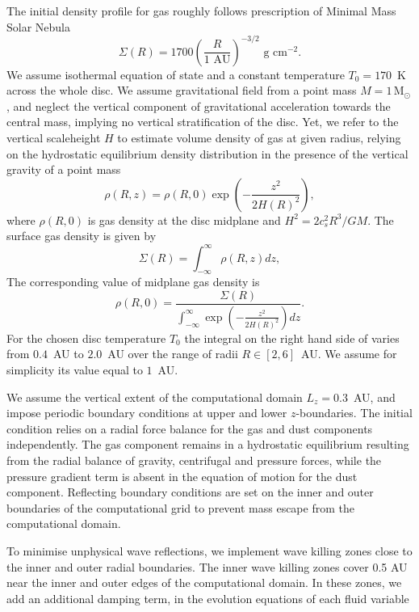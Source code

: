 The initial density profile for gas roughly follows prescription of Minimal Mass
Solar Nebula~\citep{H81}
\begin{equation}
   \Sigma(R) = 1700 \left(\frac{R}{1\textrm{ AU}}\right)^{-3/2} 
   \textrm{ g cm}^{-2}.
\end{equation}
We assume isothermal equation of state and a constant temperature $T_0 = 170$~K
across the whole disc. 
We assume gravitational field from a point mass $M=1\,\textrm{M}_\odot$, and
neglect the vertical component of gravitational acceleration towards the central
mass, implying no vertical stratification of the disc. Yet, we refer to the
vertical scaleheight $H$ to estimate  volume density of gas at given radius,
relying on the hydrostatic equilibrium density distribution in the presence of
the vertical gravity of a point mass
%
\begin{equation}
   \rho(R,z) =  \rho(R,0) \exp\left(-\frac{z^2}{2H(R)^2}\right),
\end{equation}
where $\rho(R,0)$ is gas density at the disc midplane and $H^2 = 2 c_s^2 R^3/
GM$.
%
The surface gas density is given by
\begin{equation}
   \Sigma(R) = \int_{-\infty}^\infty \rho(R,z) dz,
\end{equation}
%
The corresponding value of midplane gas density is
\begin{equation}
   \label{eq:rho}
    \rho(R,0) = \frac{\Sigma(R) }{\int_{-\infty}^\infty
   \exp\left(-\frac{z^2}{2H(R)^2}\right) dz}.
\end{equation}
For the chosen disc temperature $T_0$ the integral on the right hand side of
 varies from $0.4$~AU to $2.0$~AU over the range of radii $R\in
[2,6]$~AU. 
We assume for simplicity its value equal to $1$~AU. 

We assume the vertical extent of the computational domain $L_z = 0.3$~AU, and
impose periodic boundary conditions at upper and lower $z$-boundaries. The
initial condition relies on a radial force balance for the gas and dust
components independently. The gas component remains in a hydrostatic equilibrium
resulting from the radial balance of gravity, centrifugal and pressure forces,
while the pressure gradient term is absent in the equation of motion for the
dust component.  Reflecting boundary conditions are set on the inner and outer
boundaries of the computational grid to prevent mass escape from the
computational domain. 

\par To minimise unphysical wave reflections, we implement wave killing zones
close to the inner and outer radial boundaries. The inner wave killing zones
cover 0.5 AU near the inner and outer edges of the computational domain. In
these zones, we add an additional damping term, in the evolution equations of
each fluid variable

